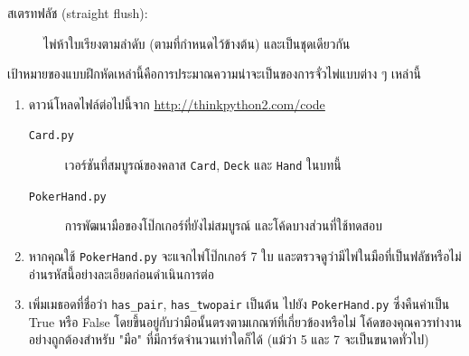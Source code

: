 \begin{exercise}
\begin{description}
\item[สเตรทฟลัช (straight flush):] ไพ่ห้าใบเรียงตามลำดับ (ตามที่กำหนดไว้ข้างต้น) และเป็นชุดเดียวกัน
\vspace{-0.05in}

\end{description}
%
เป้าหมายของแบบฝึกหัดเหล่านี้คือการประมาณความน่าจะเป็นของการจั่วไพ่แบบต่าง ๆ เหล่านี้
\begin{enumerate}

\item  ดาวน์โหลดไฟล์ต่อไปนี้จาก \url{http://thinkpython2.com/code}
\begin{description}

\item[{\tt Card.py}] เวอร์ชันที่สมบูรณ์ของคลาส {\tt Card}, {\tt Deck} และ {\tt Hand} ในบทนี้

\item[{\tt PokerHand.py}] การพัฒนามือของโป๊กเกอร์ที่ยังไม่สมบูรณ์ และโค้ดบางส่วนที่ใช้ทดสอบ

\end{description}
%
\item  หากคุณใช้ {\tt PokerHand.py} จะแจกไพ่โป๊กเกอร์ 7 ใบ และตรวจดูว่ามีไพ่ในมือที่เป็นฟลัชหรือไม่ อ่านรหัสนี้อย่างละเอียดก่อนดำเนินการต่อ

\item  เพิ่มเมธอดที่ชื่อว่า \verb"has_pair", \verb"has_twopair" เป็นต้น ไปยัง {\tt PokerHand.py} 
ซึ่งคืนค่าเป็น True หรือ False โดยขึ้นอยู่กับว่ามือนั้นตรงตามเกณฑ์ที่เกี่ยวข้องหรือไม่ โค้ดของคุณควรทำงานอย่างถูกต้องสำหรับ "มือ" ที่มีการ์ดจำนวนเท่าใดก็ได้ (แม้ว่า 5 และ 7 จะเป็นขนาดทั่วไป)



\end{enumerate}
\end{exercise}
